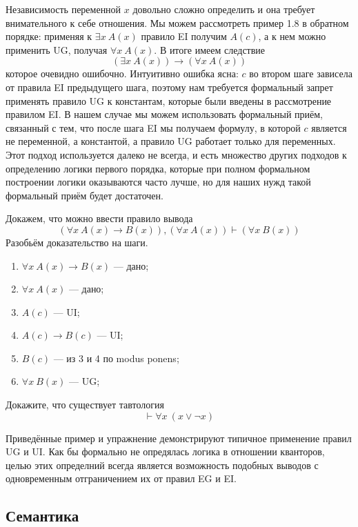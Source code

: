 Независимость переменной $x$ довольно сложно определить и она требует внимательного к себе отношения. Мы можем рассмотреть пример 1.8 в обратном порядке: применяя к $\exists x \ A(x)$ правило EI получим $A(c)$, а к нем можно применить UG, получая $\forall x\ A(x)$. В итоге имеем следствие
$$(\exists x\ A(x)) \to (\forall x\ A(x))$$
которое очевидно ошибочно. Интуитивно ошибка ясна: $c$ во втором шаге зависела от правила EI предыдущего шага, поэтому нам требуется формальный запрет применять правило UG к константам, которые были введены в рассмотрение правилом EI. В нашем случае мы можем использовать формальный приём, связанный с тем, что после шага EI мы получаем формулу, в которой $c$ является не переменной, а константой, а правило UG работает только для переменных. Этот подход используется далеко не всегда, и есть множество других подходов к определению логики первого порядка, которые при полном формальном построении логики оказываются часто лучше, но для наших нужд такой формальный приём будет достаточен.

\begin{example}
Докажем, что можно ввести правило вывода $$(\forall x\ A(x)\to B(x)), (\forall x\ A(x)) \vdash (\forall x\ B(x))$$
Разобьём доказательство на шаги.
\begin{enumerate}
\item $\forall x\ A(x) \to B(x)$ --- дано;
\item $\forall x\ A(x)$ --- дано;
\item $A(c)$ --- UI;
\item $A(c) \to B(c)$ --- UI;
\item $B(c)$ --- из 3 и 4 по modus ponens;
\item $\forall x\ B(x)$ --- UG;
\end{enumerate}
\end{example}

\begin{exercise}
Докажите, что существует тавтология $$\vdash \forall x\ (x\lor\neg x)$$
\end{exercise}

Приведённые пример и упражнение демонстрируют типичное применение правил UG и UI. Как бы формально не опредялась логика в отношении кванторов, целью этих определний всегда является возможность подобных выводов с одновременным отграничением их от правил EG и EI.

\subsection{Семантика}

